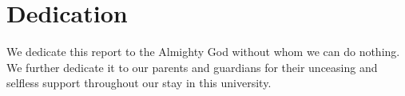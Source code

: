 \chapter*{Dedication}
We dedicate this report to the Almighty God without whom we can do nothing.
We further dedicate it to our parents and guardians for their unceasing and selfless support throughout our stay in this university.

\newpage